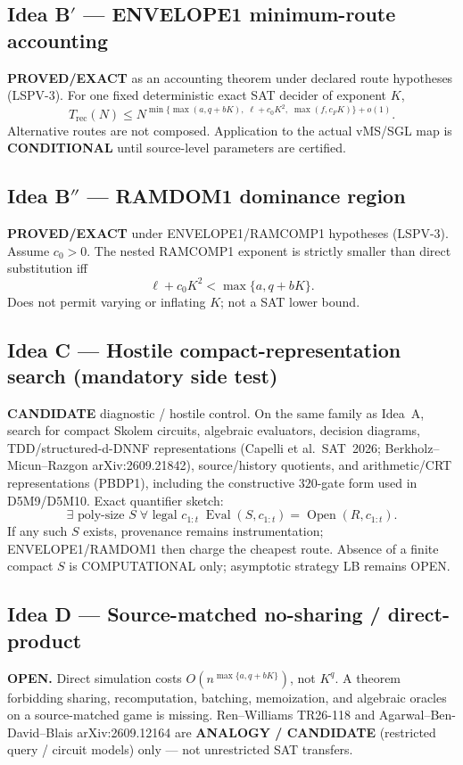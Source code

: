 \documentclass[11pt]{article}
\begin{document}
\subsection*{Idea B$'$ --- ENVELOPE1 minimum-route accounting}
\textbf{PROVED/EXACT} as an accounting theorem under declared route hypotheses
(LSPV-3). For one fixed deterministic exact SAT decider of exponent $K$,
\[
T_{\mathrm{rec}}(N)\le N^{\min\{\max(a,q+bK),\;\ell+c_0K^2,\;\max(f,c_FK)\}+o(1)}.
\]
Alternative routes are not composed. Application to the actual vMS/SGL map is
\textbf{CONDITIONAL} until source-level parameters are certified.

\subsection*{Idea B$''$ --- RAMDOM1 dominance region}
\textbf{PROVED/EXACT} under ENVELOPE1/RAMCOMP1 hypotheses (LSPV-3). Assume
$c_0>0$. The nested RAMCOMP1 exponent is strictly smaller than direct substitution
iff
\[
\ell+c_0K^2<\max\{a,q+bK\}.
\]
Does not permit varying or inflating $K$; not a SAT lower bound.

\subsection*{Idea C --- Hostile compact-representation search (mandatory side test)}
\textbf{CANDIDATE} diagnostic / hostile control. On the same family as Idea~A,
search for compact Skolem circuits, algebraic evaluators, decision diagrams,
TDD/structured-d-DNNF representations (Capelli et al.\ SAT~2026;
Berkholz--Micun--Razgon arXiv:2609.21842), source/history quotients, and
arithmetic/CRT representations (PBDP1), including the constructive $320$-gate
form used in D5M9/D5M10. Exact quantifier sketch:
\[
\exists\text{ poly-size }S\;\forall\text{ legal }c_{1:t}\;
\operatorname{Eval}(S,c_{1:t})=\operatorname{Open}(R,c_{1:t}).
\]
If any such $S$ exists, provenance remains instrumentation; ENVELOPE1/RAMDOM1
then charge the cheapest route. Absence of a finite compact $S$ is COMPUTATIONAL
only; asymptotic strategy LB remains OPEN.

\subsection*{Idea D --- Source-matched no-sharing / direct-product}
\textbf{OPEN.} Direct simulation costs $O(n^{\max\{a,q+bK\}})$, not $K^q$.
A theorem forbidding sharing, recomputation, batching, memoization, and algebraic
oracles on a source-matched game is missing. Ren--Williams TR26-118 and
Agarwal--Ben-David--Blais arXiv:2609.12164 are \textbf{ANALOGY / CANDIDATE}
(restricted query / circuit models) only --- not unrestricted SAT transfers.
\end{document}
